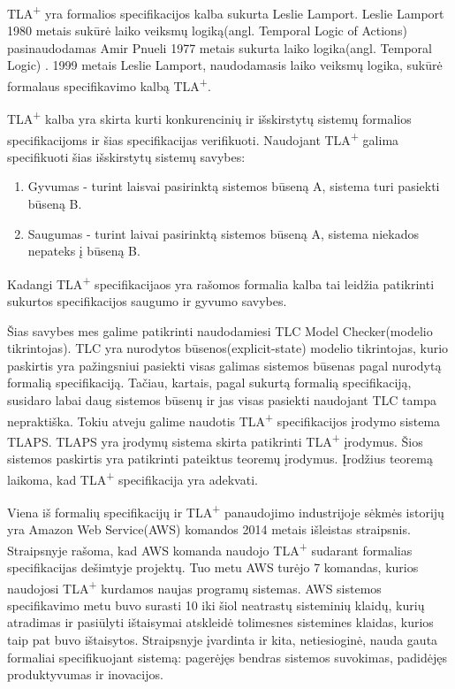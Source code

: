 \documentclass{VUMIFPSmagistrinis}
\begin{document}
		TLA\textsuperscript{+} yra formalios specifikacijos kalba sukurta Leslie Lamport\cite{lamport2002specifying}.
		Leslie Lamport 1980 metais sukūrė laiko veiksmų logiką(angl. Temporal Logic of Actions)\cite{10.1145/177492.177726} pasinaudodamas Amir Pnueli 1977 metais sukurta laiko logika(angl. Temporal Logic) \cite{4567924}.
		1999 metais Leslie Lamport, naudodamasis laiko veiksmų logika, sukūrė formalaus specifikavimo kalbą TLA\textsuperscript{+}\cite{lamport2002specifying}.
		

TLA\textsuperscript{+} kalba yra skirta kurti konkurencinių ir išskirstytų sistemų formalios specifikacijoms ir šias specifikacijas verifikuoti.
		Naudojant TLA\textsuperscript{+} galima specifikuoti šias išskirstytų sistemų savybes:
		\begin{enumerate}
			\item{Gyvumas - turint laisvai pasirinktą sistemos būseną A, sistema turi pasiekti būseną B.}
			\item{Saugumas - turint laivai pasirinktą sistemos būseną A, sistema niekados nepateks į būseną B.}
		\end{enumerate}
		Kadangi TLA\textsuperscript{+} specifikacijaos yra rašomos formalia kalba tai leidžia patikrinti sukurtos specifikacijos saugumo ir gyvumo savybes.
		

	Šias savybes mes galime patikrinti naudodamiesi TLC Model Checker(modelio tikrintojas).
		TLC yra nurodytos būsenos(explicit-state) modelio tikrintojas, kurio paskirtis yra pažingsniui pasiekti visas galimas sistemos būsenas pagal nurodytą formalią specifikaciją.
		Tačiau, kartais, pagal sukurtą formalią specifikaciją, susidaro labai daug sistemos būsenų ir jas visas pasiekti naudojant TLC tampa nepraktiška.
		Tokiu atveju galime naudotis TLA\textsuperscript{+} specifikacijos įrodymo sistema TLAPS.
		TLAPS yra įrodymų sistema skirta patikrinti TLA\textsuperscript{+} įrodymus.
		Šios sistemos paskirtis yra patikrinti pateiktus teoremų įrodymus.
		Įrodžius teoremą laikoma, kad TLA\textsuperscript{+} specifikacija yra adekvati.


		Viena iš formalių specifikacijų ir TLA\textsuperscript{+} panaudojimo industrijoje sėkmės istorijų yra Amazon Web Service(AWS) komandos 2014 metais išleistas straipsnis\cite{newcombe2014use}.
		Straipsnyje rašoma,  kad AWS komanda naudojo TLA\textsuperscript{+} sudarant formalias specifikacijas dešimtyje projektų. Tuo metu AWS turėjo 7 komandas, kurios naudojosi TLA\textsuperscript{+} kurdamos naujas programų sistemas.
		AWS sistemos specifikavimo metu buvo surasti 10 iki šiol neatrastų sisteminių klaidų, kurių atradimas ir pasiūlyti ištaisymai atskleidė tolimesnes sistemines klaidas, kurios taip pat buvo ištaisytos.
		Straipsnyje įvardinta ir kita, netiesioginė, nauda gauta formaliai specifikuojant sistemą: pagerėjęs bendras sistemos suvokimas, padidėjęs produktyvumas ir inovacijos.
		
\end{document}

